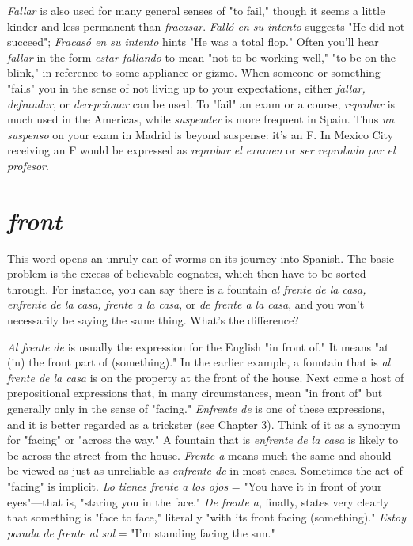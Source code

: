 \emph{Fallar} is also used for many general senses of "to
fail," though it seems a little kinder and less permanent than \emph{fracasar}.
\emph{Falló en su intento} suggests "He did not succeed"; \emph{Fracasó en su intento} hints "He was a total flop." Often you'll hear \emph{fallar} in the form
\emph{estar fallando} to mean "not to be working well," "to be on the blink,"
in reference to some appliance or gizmo. When someone or something
"fails" you in the sense of not living up to your expectations, either
\emph{fallar, defraudar}, or \emph{decepcionar} can be used. To "fail" an exam or a
course, \emph{reprobar} is much used in the Americas, while \emph{suspender} is
more frequent in Spain. Thus \emph{un suspenso} on your exam in Madrid is
beyond suspense: it's an F. In Mexico City receiving an F would be expressed as \emph{reprobar el examen} or \emph{ser reprobado par el profesor}.

\section{\emph{front}}

This word opens an unruly can of worms on its journey into
Spanish. The basic problem is the excess of believable cognates, which
then have to be sorted through. For instance, you can say there is a
fountain \emph{al frente de la casa, enfrente de la casa, frente a la casa}, or
\emph{de frente a la casa}, and you won't necessarily be saying the same
thing. What's the difference?

\emph{Al frente de} is usually the expression for the English "in front
of." It means "at (in) the front part of (something)." In the earlier example, a fountain that is \emph{al frente de la casa} is on the property at the
front of the house. Next come a host of prepositional expressions that,
in many circumstances, mean "in front of" but generally only in the
sense of "facing." \emph{Enfrente de} is one of these expressions, and it is better regarded as a trickster (see Chapter 3). Think of it as a synonym for
"facing" or "across the way." A fountain that is \emph{enfrente de la casa} is
likely to be across the street from the house. \emph{Frente a} means much the
same and should be viewed as just as unreliable as \emph{enfrente de} in most
cases. Sometimes the act of "facing" is implicit. \emph{Lo tienes frente a los
ojos} = "You have it in front of your eyes"---that is, "staring you in the
face." \emph{De frente a}, finally, states very clearly that something is "face
to face," literally "with its front facing (something)." \emph{Estoy parada de
frente al sol} = "I'm standing facing the sun."

